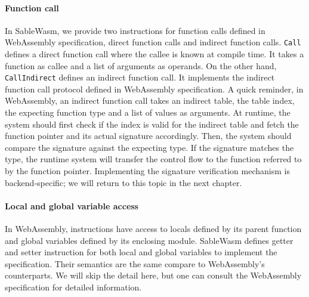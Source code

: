 \paragraph{Function call} In SableWasm, we provide two instructions for function calls defined in WebAssembly specification, direct function calls and indirect function calls. \texttt{Call} defines a direct function call where the callee is known at compile time. It takes a function as callee and a list of arguments as operands. On the other hand, \texttt{CallIndirect} defines an indirect function call. It implements the indirect function call protocol defined in WebAssembly specification. A quick reminder, in WebAssembly, an indirect function call takes an indirect table, the table index, the expecting function type and a list of values as arguments. At runtime, the system should first check if the index is valid for the indirect table and fetch the function pointer and its actual signature accordingly. Then, the system should compare the signature against the expecting type. If the signature matches the type, the runtime system will transfer the control flow to the function referred to by the function pointer. Implementing the signature verification mechanism is backend-specific; we will return to this topic in the next chapter.

\paragraph{Local and global variable access} In WebAssembly, instructions have access to locals defined by its parent function and global variables defined by its enclosing module. SableWasm defines getter and setter instruction for both local and global variables to implement the specification. Their semantics are the same compare to WebAssembly's counterparts. We will skip the detail here, but one can consult the WebAssembly specification for detailed information.


